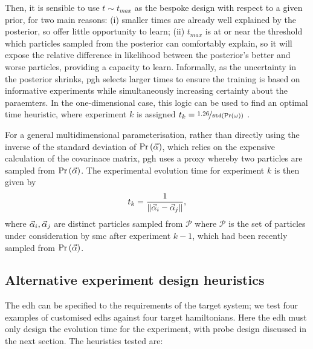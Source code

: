 Then, it is sensible to use $t \sim t_{max}$ as the bespoke design with respect to a given prior, 
    for two main reasons: 
    (i) smaller times are already well explained by the posterior, so offer little opportunity to learn;
    (ii) $t_{max}$ is at or near the threshold which \glspl{particle} sampled from the posterior can comfortably explain, 
        so it will expose the relative difference in \gls{likelihood} between the posterior's better and worse \glspl{particle}, 
        providing a capacity to learn. 
Informally, as the uncertainty in the posterior shrinks, \gls{pgh} selects larger times 
    to ensure the training is based on informative \glspl{experiment} while 
    simultaneously increasing certainty about the paraemters. 
In the one-dimensional case, this logic can be used to find an optimal time heuristic, 
    where \gls{experiment} $k$ is assigned $t_k = \nicefrac{1.26}{\texttt{std}\left(\Pr(\omega)\right)}$ \cite{ferrie2013best}. 
\par
For a general multidimensional parameterisation, 
    rather than directly using the inverse of the standard deviation of $\Pr \left(\vec{\alpha}\right)$, 
    which relies on the expensive calculation of the covarinace matrix, 
    \gls{pgh} uses a proxy whereby two \glspl{particle} are sampled from $\Pr \left(\vec{\alpha}\right)$. 
The experimental evolution time for \gls{experiment} $k$ is then given by 
\begin{equation}
    \label{eqn:pgh_time}
    t_k = \frac{1}{\| \vec{\alpha}_i - \vec{\alpha}_j \|}, 
\end{equation}
    where $\vec{\alpha}_i, \vec{\alpha}_j$ are distinct \glspl{particle} sampled from $\mathcal{P}$ where 
    $\mathcal{P}$ is the set of \glspl{particle} under consideration by \gls{smc} after \gls{experiment} $k-1$, 
    which had been recently sampled from $\Pr\left(\vec{\alpha}\right)$. 
\par 


\subsection{Alternative experiment design heuristics}\label{sec:alt_heuristics}
The \gls{edh} can be specified to the requirements of the target system; 
    we test four examples of customised \glspl{edh} against four target \glspl{hamiltonian}.
Here the \gls{edh} must only design the evolution time for the experiment, 
    with \gls{probe} design discussed in the next section. 
The heuristics tested are:

